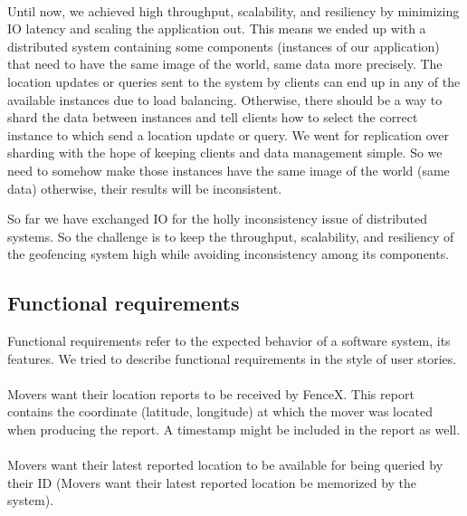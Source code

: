 \documentclass[a4]{report}
\begin{document}
    \paragraph{}
    Until now, we achieved high throughput, scalability, and resiliency by minimizing IO latency and scaling the
    application out.
    This means we ended up with a distributed system containing some components (instances of our application) that
    need to have the same image of the world, same data more precisely.
    The location updates or queries sent to the system by clients can end up in any of the available instances due
    to load balancing.
    Otherwise, there should be a way to shard the data between instances and tell clients how to select the correct
    instance to which send a location update or query.
    We went for replication over sharding with the hope of keeping clients and data management simple.
    So we need to somehow make those instances have the same image of the world (same data) otherwise, their results will be inconsistent.

    So far we have exchanged IO for the holly inconsistency issue of distributed systems.
    So the challenge is to keep the throughput, scalability, and resiliency of the geofencing system high while avoiding inconsistency among its components.

    \subsection{Functional requirements}
    Functional requirements refer to the expected behavior of a software system, its features.
    We tried to describe functional requirements in the style of user stories\cite{userStory}.

    \paragraph{}
    Movers want their location reports to be received by FenceX.
    This report contains the coordinate (latitude, longitude) at which the mover was located when producing the report.
    A timestamp might be included in the report as well.

    \paragraph{}
    Movers want their latest reported location to be available for being queried by their ID (Movers want their
    latest reported location be memorized by the system).
\end{document}

